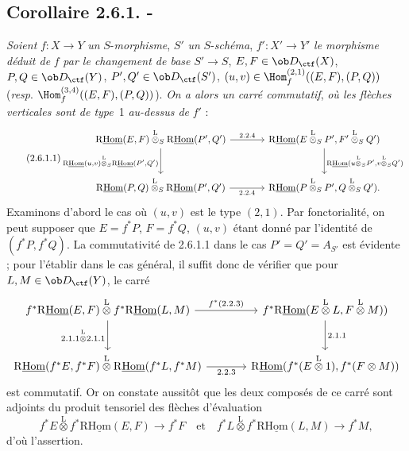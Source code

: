 \subsection*{Corollaire 2.6.1. -}
\emph{Soient} $f:X\to Y$ \emph{un} $S$-\emph{morphisme}, $S'$ \emph{un} $S$-\emph{schéma}, $f':X'\to Y'$ \emph{le morphisme déduit de} $f$ \emph{par le changement de base} $S'\to S$, $E,F\in\ob D_{\ctf}(X)$, $P,Q\in\ob D_{\ctf}(Y)$, $P',Q'\in\ob D_{\ctf}(S')$, $(u,v)\in\Hom_f^{(2,1)}((E,F),(P,Q))$ (\emph{resp}. $\Hom_f^{(3,4)}((E,F),(P,Q))$). \emph{On a alors un carré commutatif}, \emph{où les flèches verticales sont de type}~1 \emph{au-dessus de} $f'$ :
\begin{equation}\tag{2.6.1.1}
\begin{tikzcd}[column sep=large,row sep=large]
\mathrm{R}\underline{\mathrm{Hom}}(E,F)\overset{\mathrm{L}}{\otimes}_S\mathrm{R}\underline{\mathrm{Hom}}(P',Q') \arrow[r,"2.2.4"] \arrow[d,"{\mathrm{R}\underline{\mathrm{Hom}}(u,v)\overset{\mathrm{L}}{\otimes}_S\mathrm{R}\underline{\mathrm{Hom}}(P',Q')}"'] & \mathrm{R}\underline{\mathrm{Hom}}(E\overset{\mathrm{L}}{\otimes}_SP',F'\overset{\mathrm{L}}{\otimes}_SQ') \arrow[d,"{\mathrm{R}\underline{\mathrm{Hom}}(u\overset{\mathrm{L}}{\otimes}_SP',v\overset{\mathrm{L}}{\otimes}_SQ')}"]\\
\mathrm{R}\underline{\mathrm{Hom}}(P,Q)\overset{\mathrm{L}}{\otimes}_S\mathrm{R}\underline{\mathrm{Hom}}(P',Q') \arrow[r,"2.2.4"'] & \mathrm{R}\underline{\mathrm{Hom}}(P\overset{\mathrm{L}}{\otimes}_SP',Q\overset{\mathrm{L}}{\otimes}_SQ').
\end{tikzcd}
\end{equation}
Examinons d'abord le cas où $(u,v)$ est le type $(2,1)$. Par fonctorialité, on peut supposer que $E=f^{*}P$, $F=f^{*}Q$, $(u,v)$ étant donné par l'identité de $(f^{*}P,f^{*}Q)$. La commutativité de 2.6.1.1 dans le cas $P'=Q'=A_{S'}$ est évidente ; pour l'établir dans le cas général, il suffit donc de vérifier que pour $L,M\in\ob D_{\ctf}(Y)$, le carré
\[
\begin{tikzcd}[column sep=large,row sep=large]
f^{*}\mathrm{R}\underline{\mathrm{Hom}}(E,F)\overset{\mathrm{L}}{\otimes} f^{*}\mathrm{R}\underline{\mathrm{Hom}}(L,M) \arrow[r,"{f^*(2.2.3)}"] \arrow[d,"{2.1.1\overset{\mathrm{L}}{\otimes} 2.1.1}"'] & f^{*}\mathrm{R}\underline{\mathrm{Hom}}(E\overset{\mathrm{L}}{\otimes}L,F\overset{\mathrm{L}}{\otimes}M)) \arrow[d,"2.1.1"]\\
\mathrm{R}\underline{\mathrm{Hom}}(f^{*}E,f^{*}F)\overset{\mathrm{L}}{\otimes}\mathrm{R}\underline{\mathrm{Hom}}(f^{*}L,f^{*}M) \arrow[r,"2.2.3"'] & \mathrm{R}\underline{\mathrm{Hom}}(f^{*}(E\overset{\mathrm{L}}{\otimes}1),f^{*}(F\otimes M))
\end{tikzcd}
\]
est commutatif. Or on constate aussitôt que les deux composés de ce carré sont adjoints du produit tensoriel des flèches d'évaluation
\[
f^{*}E\overset{\mathrm{L}}{\otimes} f^{*}\mathrm{R}\underline{\mathrm{Hom}}(E,F)\longrightarrow f^{*}F
\quad\text{et}\quad
f^{*}L\overset{\mathrm{L}}{\otimes} f^{*}\mathrm{R}\underline{\mathrm{Hom}}(L,M)\longrightarrow f^{*}M,
\]
d'où l'assertion.

